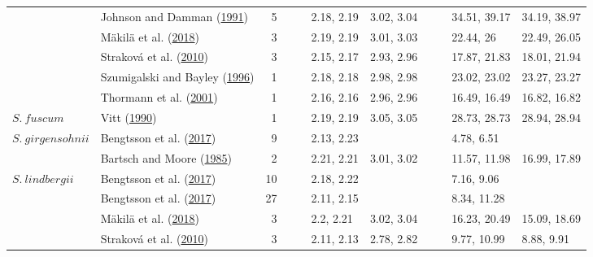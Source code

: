 \documentclass[
  12pt,
]{article}
\begin{document}
\begin{table}[H]
{\begin{tabular}[t]{llrllllllll}
 & Johnson and Damman (\protect\hyperlink{ref-Johnson.1991}{1991}) & 5 &  &  & 2.18, 2.19 & 3.02, 3.04 &  &  & 34.51, 39.17 & 34.19, 38.97\\

 & Mäkilä et al. (\protect\hyperlink{ref-Makila.2018}{2018}) & 3 &  &  & 2.19, 2.19 & 3.01, 3.03 &  &  & 22.44, 26 & 22.49, 26.05\\

 & Straková et al. (\protect\hyperlink{ref-Strakova.2010}{2010}) & 3 &  &  & 2.15, 2.17 & 2.93, 2.96 &  &  & 17.87, 21.83 & 18.01, 21.94\\

 & Szumigalski and Bayley (\protect\hyperlink{ref-Szumigalski.1996}{1996}) & 1 &  &  & 2.18, 2.18 & 2.98, 2.98 &  &  & 23.02, 23.02 & 23.27, 23.27\\

 & Thormann et al. (\protect\hyperlink{ref-Thormann.2001}{2001}) & 1 &  &  & 2.16, 2.16 & 2.96, 2.96 &  &  & 16.49, 16.49 & 16.82, 16.82\\

\multirow[t]{-10}{*}{\raggedright\arraybackslash $S.~fuscum$} & Vitt (\protect\hyperlink{ref-Vitt.1990}{1990}) & 1 &  &  & 2.19, 2.19 & 3.05, 3.05 &  &  & 28.73, 28.73 & 28.94, 28.94\\
\cmidrule{1-11}
$S.~girgensohnii$ & Bengtsson et al. (\protect\hyperlink{ref-Bengtsson.2017}{2017}) & 9 &  &  & 2.13, 2.23 &  &  &  & 4.78, 6.51 & \\
\cmidrule{1-11}
 & Bartsch and Moore (\protect\hyperlink{ref-Bartsch.1985}{1985}) & 2 &  &  & 2.21, 2.21 & 3.01, 3.02 &  &  & 11.57, 11.98 & 16.99, 17.89\\

\multirow[t]{-2}{*}{\raggedright\arraybackslash $S.~lindbergii$} & Bengtsson et al. (\protect\hyperlink{ref-Bengtsson.2017}{2017}) & 10 &  &  & 2.18, 2.22 &  &  &  & 7.16, 9.06 & \\
\cmidrule{1-11}
 & Bengtsson et al. (\protect\hyperlink{ref-Bengtsson.2017}{2017}) & 27 &  &  & 2.11, 2.15 &  &  &  & 8.34, 11.28 & \\

 & Mäkilä et al. (\protect\hyperlink{ref-Makila.2018}{2018}) & 3 &  &  & 2.2, 2.21 & 3.02, 3.04 &  &  & 16.23, 20.49 & 15.09, 18.69\\

 & Straková et al. (\protect\hyperlink{ref-Strakova.2010}{2010}) & 3 &  &  & 2.11, 2.13 & 2.78, 2.82 &  &  & 9.77, 10.99 & 8.88, 9.91\\


\end{tabular}}
\end{table}
\end{document}
